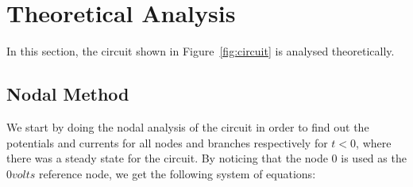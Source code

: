 \section{Theoretical Analysis}
\label{sec:analysis}

In this section, the circuit shown in Figure~\ref{fig:circuit} is analysed
theoretically.


\subsection{Nodal Method}

We start by doing the nodal analysis of the circuit in order to find out the potentials and currents for all nodes and branches respectively for $t < 0$,
where there was a steady state for the circuit. By noticing that the node 0 is used as the $0 volts$ reference node, we get the following system of equations:




